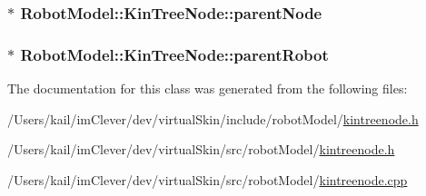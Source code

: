 \label{class_robot_model_1_1_kin_tree_node_acc89f79d42901042ca47a7b56761d4b1}
\hypertarget{class_robot_model_1_1_kin_tree_node_af2a0ed90edef2013eeadcd5b5174c420}{
\subsubsection[{parentNode}]{ $\ast$ {\bf RobotModel::KinTreeNode::parentNode}}}
\label{class_robot_model_1_1_kin_tree_node_af2a0ed90edef2013eeadcd5b5174c420}
\hypertarget{class_robot_model_1_1_kin_tree_node_aabd31bc0263bb2a830bde65af0eba1a6}{
\subsubsection[{parentRobot}]{ $\ast$ {\bf RobotModel::KinTreeNode::parentRobot}}}
\label{class_robot_model_1_1_kin_tree_node_aabd31bc0263bb2a830bde65af0eba1a6}


The documentation for this class was generated from the following files:\begin{DoxyCompactItemize}
\item 
/Users/kail/imClever/dev/virtualSkin/include/robotModel/\hyperlink{include_2robot_model_2kintreenode_8h}{kintreenode.h}\item 
/Users/kail/imClever/dev/virtualSkin/src/robotModel/\hyperlink{src_2robot_model_2kintreenode_8h}{kintreenode.h}\item 
/Users/kail/imClever/dev/virtualSkin/src/robotModel/\hyperlink{kintreenode_8cpp}{kintreenode.cpp}\end{DoxyCompactItemize}
